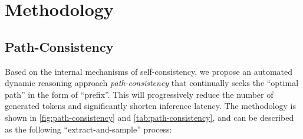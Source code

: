 \section{Methodology}
\vspace{-2mm}
\subsection{Path-Consistency}\label{sec:path-consistency}
\vspace{-2mm}

Based on the internal mechanisms of self-consistency, we propose an automated dynamic reasoning approach \textit{path-consistency} that continually seeks the ``optimal path'' in the form of ``prefix''. This will progressively reduce the number of generated tokens and significantly shorten inference latency. The methodology is shown in \cref{fig:path-consistency} and \cref{tab:path-consistency}, and can be described as the following ``extract-and-sample'' process:




